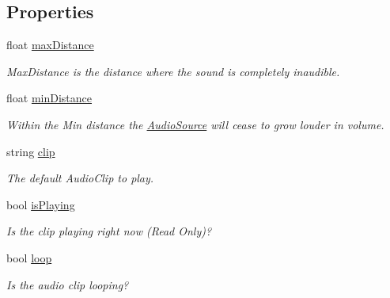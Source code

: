 \subsection*{Properties}
\begin{DoxyCompactItemize}
\item 
float \mbox{\hyperlink{class_lua_1_1_audio_source_a55ad4d09380c973f2001b2164aba4771}{max\+Distance}}
\begin{DoxyCompactList}\small\item\em Max\+Distance is the distance where the sound is completely inaudible. \end{DoxyCompactList}\item 
float \mbox{\hyperlink{class_lua_1_1_audio_source_a66155ad664c665455476ea70f4779669}{min\+Distance}}
\begin{DoxyCompactList}\small\item\em Within the Min distance the \mbox{\hyperlink{class_lua_1_1_audio_source}{Audio\+Source}} will cease to grow louder in volume. \end{DoxyCompactList}\item 
string \mbox{\hyperlink{class_lua_1_1_audio_source_a4913b6f1fa8dfe5eb528cd7e40f91684}{clip}}
\begin{DoxyCompactList}\small\item\em The default Audio\+Clip to play. \end{DoxyCompactList}\item 
bool \mbox{\hyperlink{class_lua_1_1_audio_source_aaef47740090cbe41ff5b4f4b40aad7b7}{is\+Playing}}
\begin{DoxyCompactList}\small\item\em Is the clip playing right now (Read Only)? \end{DoxyCompactList}\item 
bool \mbox{\hyperlink{class_lua_1_1_audio_source_a4ffd0dfe8f989efe964e368cc2a5995c}{loop}}
\begin{DoxyCompactList}\small\item\em Is the audio clip looping? \end{DoxyCompactList}\item 

\end{DoxyCompactItemize}
